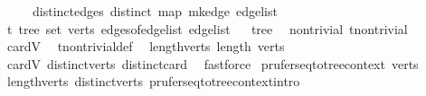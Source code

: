 \begin{isabellebody}
\ \ \ \ \ distinct{\isacharunderscore}{\kern0pt}edges{\isacharcolon}{\kern0pt}\ {\isachardoublequoteopen}distinct\ {\isacharparenleft}{\kern0pt}map\ mk{\isacharunderscore}{\kern0pt}edge\ edge{\isacharunderscore}{\kern0pt}list{\isacharparenright}{\kern0pt}{\isachardoublequoteclose}\isanewline
{}\isanewline
\isanewline
{}\isamarkupfalse%
\ t{\isacharcolon}{\kern0pt}\ tree\ {\isachardoublequoteopen}set\ verts{\isachardoublequoteclose}\ {\isachardoublequoteopen}edges{\isacharunderscore}{\kern0pt}of{\isacharunderscore}{\kern0pt}edge{\isacharunderscore}{\kern0pt}list\ edge{\isacharunderscore}{\kern0pt}list{\isachardoublequoteclose}%
\isadelimproof
\ %
\endisadelimproof
%
\isatagproof
{}\isamarkupfalse%
\ tree\ \isacommand{{\isachardot}{\kern0pt}}\isamarkupfalse%
%
\endisatagproof
{\isafoldproof}%
%
\isadelimproof
%
\endisadelimproof
\isanewline
\isanewline
{}\isamarkupfalse%
\ non{\isacharunderscore}{\kern0pt}trivial{\isacharcolon}{\kern0pt}\ {\isachardoublequoteopen}t{\isachardot}{\kern0pt}non{\isacharunderscore}{\kern0pt}trivial{\isachardoublequoteclose}\isanewline
%
\isadelimproof
\ \ %
\endisadelimproof
%
\isatagproof
{}\isamarkupfalse%
\ card{\isacharunderscore}{\kern0pt}V\ \isamarkupfalse%
\ t{\isachardot}{\kern0pt}non{\isacharunderscore}{\kern0pt}trivial{\isacharunderscore}{\kern0pt}def\ \isacommand{{\isachardot}{\kern0pt}}\isamarkupfalse%
%
\endisatagproof
{\isafoldproof}%
%
\isadelimproof
\isanewline
%
\endisadelimproof
\isanewline
{}\isamarkupfalse%
\ length{\isacharunderscore}{\kern0pt}verts{\isacharcolon}{\kern0pt}\ {\isachardoublequoteopen}length\ verts\ {\isasymge}\ {}{\isachardoublequoteclose}\isanewline
%
\isadelimproof
\ \ %
\endisadelimproof
%
\isatagproof
{}\isamarkupfalse%
\ card{\isacharunderscore}{\kern0pt}V\ distinct{\isacharunderscore}{\kern0pt}verts\ distinct{\isacharunderscore}{\kern0pt}card\ \isamarkupfalse%
\ fastforce%
\endisatagproof
{\isafoldproof}%
%
\isadelimproof
\isanewline
%
\endisadelimproof
\isanewline
{}\isamarkupfalse%
\ prufer{\isacharunderscore}{\kern0pt}seq{\isacharunderscore}{\kern0pt}to{\isacharunderscore}{\kern0pt}tree{\isacharunderscore}{\kern0pt}context\ verts%
\isadelimproof
\ %
\endisadelimproof
%
\isatagproof
{}\isamarkupfalse%
\ length{\isacharunderscore}{\kern0pt}verts\ distinct{\isacharunderscore}{\kern0pt}verts\ prufer{\isacharunderscore}{\kern0pt}seq{\isacharunderscore}{\kern0pt}to{\isacharunderscore}{\kern0pt}tree{\isacharunderscore}{\kern0pt}context{\isachardot}{\kern0pt}intro\ \isamarkupfalse%

\end{isabellebody}
